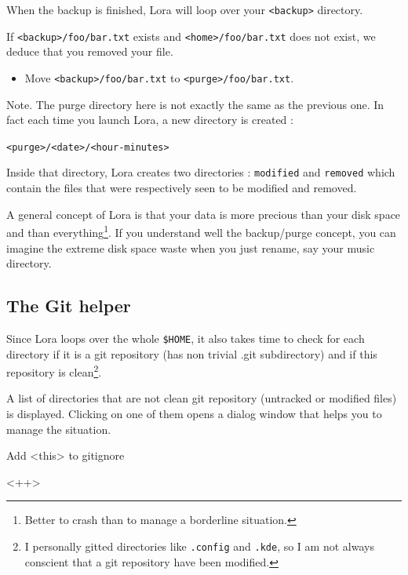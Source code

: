 \documentclass[a4paper,12pt]{article}
\newcommand{\info}[1]{\texttt{#1}}
\begin{document}
When the backup is finished, Lora will loop over your \info{<backup>} directory.

If \info{<backup>/foo/bar.txt} exists and \info{<home>/foo/bar.txt} does not exist, we deduce that you removed your file.
\begin{itemize}
    \item 
        Move \info{<backup>/foo/bar.txt} to \info{<purge>/foo/bar.txt}.
\end{itemize}
Note. The purge directory here is not exactly the same as the previous one. In fact each time you launch Lora, a new directory is created :
\begin{center}
    \info{<purge>/<date>/<hour-minutes>}
\end{center}
Inside that directory, Lora creates two directories : \info{modified} and \info{removed} which contain the files that were respectively seen to be modified and removed.

A general concept of Lora is that your data is more precious than your disk space and than everything\footnote{Better to crash than to manage a borderline situation.}. If you understand well the backup/purge concept, you can imagine the extreme disk space waste when you just rename, say your music directory.

\subsection{The Git helper}

Since Lora loops over the whole \info{\$HOME}, it also takes time to check for each directory if it is a git repository (has non trivial .git subdirectory) and if this repository is clean\footnote{I personally gitted directories like \info{.config} and \info{.kde}, so I am not always conscient that a git repository have been modified.}.

A list of directories that are not clean git repository (untracked or modified files) is displayed. Clicking on one of them opens a dialog window that helps you to manage the situation.


\begin{description}
    \item[Add <this> to gitignore]
\end{description}
<++>
\end{document}
